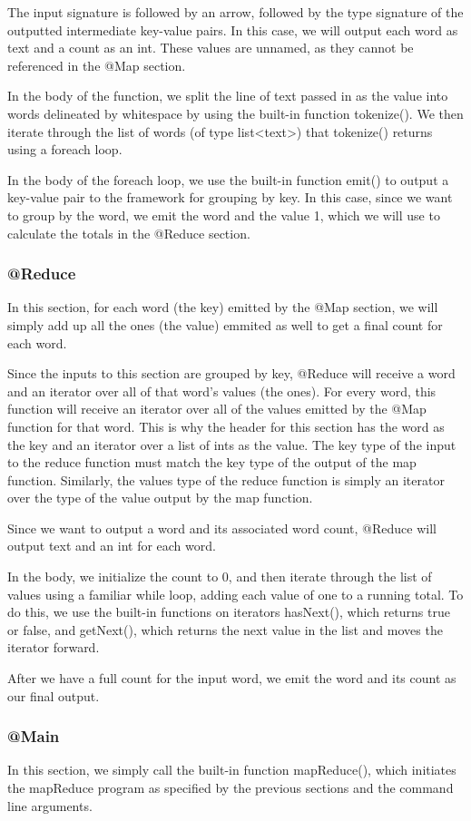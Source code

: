 \documentclass{article}
\begin{document}
The input signature is followed by an arrow, followed by the type signature of the outputted intermediate key-value pairs. In this case, we will output each word as text and a count as an int. These values are unnamed, as they cannot be referenced in the @Map section.

In the body of the function, we split the line of text passed in as the value into words delineated by whitespace by using the built-in function tokenize(). We then iterate through the list of words (of type list<text>) that tokenize() returns using a foreach loop. 

In the body of the foreach loop, we use the built-in function emit() to output a key-value pair to the framework for grouping by key. In this case, since we want to group by the word, we emit the word and the value 1, which we will use to calculate the totals in the @Reduce section.

\subsubsection*{@Reduce}
In this section, for each word (the key) emitted by the @Map section, we will simply add up all the ones (the value) emmited as well to get a final count for each word. 

Since the inputs to this section are grouped by key, @Reduce will receive a word and an iterator over all of that word's values (the ones). For every word, this function will receive an iterator over all of the values emitted by the @Map function for that word. This is why the header for this section has the word as the key and an iterator over a list of ints as the value. The key type of the input to the reduce function must match the key type of the output of the map function. Similarly, the values type of the reduce function is simply an iterator over the type of the value output by the map function.

Since we want to output a word and its associated word count, @Reduce will output text and an int for each word.

In the body, we initialize the count to 0, and then iterate through the list of values using a familiar while loop, adding each value of one to a running total. To do this, we use the built-in functions on iterators hasNext(), which returns true or false, and getNext(), which returns the next value in the list and moves the iterator forward. 

After we have a full count for the input word, we emit the word and its count as our final output.

\subsubsection*{@Main}
In this section, we simply call the built-in function mapReduce(), which initiates the mapReduce program as specified by the previous sections and the command line arguments.
\end{document}
